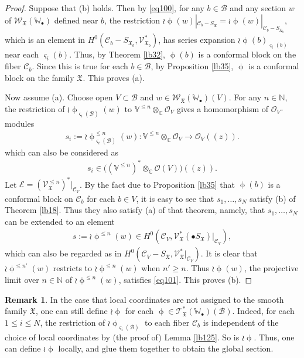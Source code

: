\documentclass[12pt,b5paper,notitlepage]{report}
\theoremstyle{definition}
\newtheorem{rem}[df]{Remark}
\theoremstyle{plain}
\newcommand{\fk}{\mathfrak}
\newcommand{\mc}{\mathcal}
\newcommand{\scr}{\mathscr}
\newcommand{\sgm}{\varsigma}
\newcommand{\blt}{\bullet}
\newcommand{\Vbb}{\mathbb V}
\newcommand{\Wbb}{\mathbb W}
\newcommand{\Cbb}{\mathbb C}
\newcommand{\Nbb}{\mathbb N}
\numberwithin{equation}{section}
\begin{document}
\begin{proof}
Suppose that (b) holds. Then by \eqref{eq100}, for any $b\in\mc B$ and any section $w$ of $\scr W_{\fk X}(\Wbb_\blt)$ defined near $b$, the restriction $\wr\upphi(w)|_{\mc C_b-S_{\fk X}}=\wr\upphi(w)|_{\mc C_b-S_{\fk X_b}}$, which is an element in $H^0(\mc C_b-S_{\fk X_b},\scr V_{\fk X_b}^*)$, has series expansion 
$\wr\upphi(b)_{\sgm_i(b)}$ near each $\sgm_i(b)$. Thus, by Theorem \ref{lb32}, $\upphi(b)$ is a conformal block on the fiber $\mc C_b$. Since this is true for each $b\in\mc B$, by Proposition \ref{lb35}, $\upphi$ is a conformal block on the family $\fk X$. This proves (a).

Now assume (a). Choose  open $V\subset \mc B$ and $w\in\scr W_{\fk X}(\Wbb_\blt)(V)$. For any $n\in\Nbb$, the restriction of $\wr\upphi_{\sgm_i(\mc B)}(w)$ to $\Vbb^{\leq n}\otimes_\Cbb\scr O_V$ gives a homomorphism of $\scr O_V$-modules
\begin{align*}
s_i:=\wr\upphi^{\leq n}_{\sgm_i(\mc B)}(w):\Vbb^{\leq n}\otimes_\Cbb\scr O_V\rightarrow\scr O_V((z)).
\end{align*}
which can also be considered as
\begin{align*}
s_i\in\big((\Vbb^{\leq n})^*\otimes_\Cbb\scr O(V)\big)((z)).
\end{align*}
Let $\scr E=(\scr V_{\fk X}^{\leq n})^*|_{\mc C_V}$. By the fact due to Proposition \ref{lb35} that $\upphi(b)$ is a conformal block on $\mc C_b$ for each $b\in V$, it is easy to see that  $s_1,\dots,s_N$ satisfy (b) of Theorem \ref{lb18}. Thus they also satisfy (a) of that theorem, namely, that $s_1,\dots,s_N$ can be extended to an element
\begin{align*}
s:=\wr\upphi^{\leq n}(w)\in H^0(\mc C_V,\scr V_{\fk X}^*(\blt S_{\fk X})|_{\mc C_V}),
\end{align*}
which can also be regarded as in $H^0(\mc C_V-S_{\fk X},\scr V_{\fk X}^*|_{\mc C_V})$. It is clear that $\wr\upphi^{\leq n'}(w)$ restricts to $\wr\upphi^{\leq n}(w)$ when $n'\geq n$. Thus $\wr\upphi(w)$, the projective limit over $n\in\Nbb$ of $\wr\upphi^{\leq n}(w)$, satisfies \eqref{eq101}. This proves (b).
\end{proof}


\begin{rem}
In the case that local coordinates are not assigned to the smooth family $\fk X$, one can still define $\wr\upphi$ for each $\upphi\in\scr T_{\fk X}^*(\Wbb_\blt)(\mc B)$. Indeed, for each $1\leq i\leq N$,  the restriction of $\wr\upphi_{\sgm_i(\mc B)}$ to each fiber $\mc C_b$ is independent of the choice of local coordinates by (the proof of) Lemma \ref{lb125}. So is $\wr\upphi$. Thus, one can define $\wr\upphi$ locally, and glue them together to obtain the global section.
\end{rem}
\end{document}
